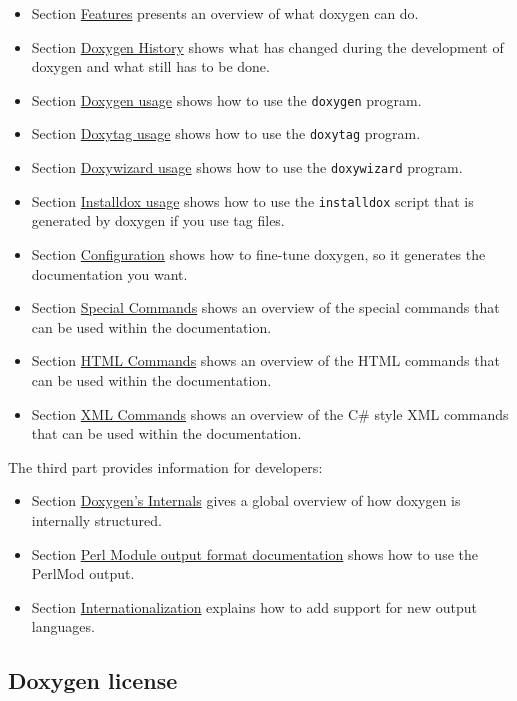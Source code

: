 \begin{itemize}
\item Section \hyperlink{features}{Features} presents an overview of what doxygen can do. \item Section \hyperlink{history}{Doxygen History} shows what has changed during the development of doxygen and what still has to be done. \item Section \hyperlink{doxygen_usage}{Doxygen usage} shows how to use the {\tt doxygen} program. \item Section \hyperlink{doxytag_usage}{Doxytag usage} shows how to use the {\tt doxytag} program. \item Section \hyperlink{doxywizard_usage}{Doxywizard usage} shows how to use the {\tt doxywizard} program. \item Section \hyperlink{installdox_usage}{Installdox usage} shows how to use the {\tt installdox} script that is generated by doxygen if you use tag files. \item Section \hyperlink{config}{Configuration} shows how to fine-tune doxygen, so it generates the documentation you want. \item Section \hyperlink{commands}{Special Commands} shows an overview of the special commands that can be used within the documentation. \item Section \hyperlink{htmlcmds}{HTML Commands} shows an overview of the HTML commands that can be used within the documentation. \item Section \hyperlink{xmlcmds}{XML Commands} shows an overview of the C\# style XML commands that can be used within the documentation. \end{itemize}


The third part provides information for developers:

\begin{itemize}
\item Section \hyperlink{arch}{Doxygen's Internals} gives a global overview of how doxygen is internally structured. \item Section \hyperlink{perlmod}{Perl Module output format documentation} shows how to use the PerlMod output. \item Section \hyperlink{langhowto}{Internationalization} explains how to add support for new output languages. \end{itemize}


\par
\subsection*{Doxygen license}


